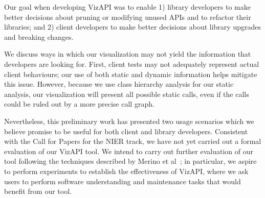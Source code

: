 \label{sec:discussion}
Our goal when developing VizAPI was to enable 1) library developers to make better
decisions about pruning or modifying unused APIs and to refactor their
libraries; and 2) client developers to make better decisions about library
upgrades and breaking changes.


We discuss ways in which our visualization may not yield the
information that developers are looking for. First, client tests may
not adequately represent actual client behaviours; our use of both static
and dynamic information helps mitigate this issue. However, because we use
class hierarchy analysis for our static analysis, our visualization will present
all possible static calls, even if the calls could be ruled out by a more
precise call graph.

Nevertheless, this preliminary work has presented two usage scenarios which we
believe promise to be useful for both client and library
developers. Consistent with the Call for Papers for the NIER track, we
have not yet carried out a formal evaluation of our VizAPI tool. We
intend to carry out further evaluation of our tool following the
techniques described by Merino et
al~\cite{merino18:_system_liter_review_softw_visual_evaluat}; in
particular, we aspire to perform experiments to establish the
effectiveness of VizAPI, where we ask users to perform software
understanding and maintenance tasks that would benefit from our tool.


